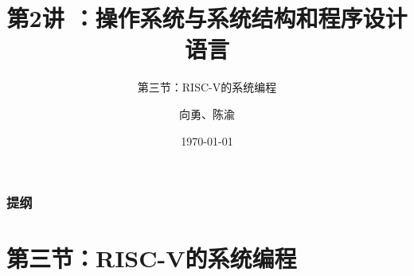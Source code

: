 


\title[第2讲]{第2讲 ：操作系统与系统结构和程序设计语言} %
\subtitle{第三节：RISC-V的系统编程}
\author{向勇、陈渝} %
\date{\today} %



\begin{frame}
\titlepage %
\end{frame}

\begin{frame}
\frametitle{提纲} %
\tableofcontents %
\end{frame}


\section{第三节：RISC-V的系统编程 } %

